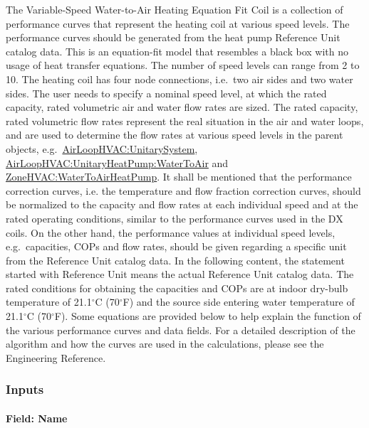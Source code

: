 The Variable-Speed Water-to-Air Heating Equation Fit Coil is a collection of performance curves that represent the heating coil at various speed levels. The performance curves should be generated from the heat pump Reference Unit catalog data. This is an equation-fit model that resembles a black box with no usage of heat transfer equations. The number of speed levels can range from 2 to 10. The heating coil has four node connections, i.e.~two air sides and two water sides. The user needs to specify a nominal speed level, at which the rated capacity, rated volumetric air and water flow rates are sized. The rated capacity, rated volumetric flow rates represent the real situation in the air and water loops, and are used to determine the flow rates at various speed levels in the parent objects, e.g.~\hyperref[airloophvacunitarysystem]{AirLoopHVAC:UnitarySystem}, \hyperref[airloophvacunitaryheatpumpwatertoair]{AirLoopHVAC:UnitaryHeatPump:WaterToAir} and \hyperref[zonehvacwatertoairheatpump]{ZoneHVAC:WaterToAirHeatPump}. It shall be mentioned that the performance correction curves, i.e. the temperature and flow fraction correction curves, should be normalized to the capacity and flow rates at each individual speed and at the rated operating conditions, similar to the performance curves used in the DX coils. On the other hand, the performance values at individual speed levels, e.g.~capacities, COPs and flow rates, should be given regarding a specific unit from the Reference Unit catalog data. In the following content, the statement started with Reference Unit means the actual Reference Unit catalog data. The rated conditions for obtaining the capacities and COPs are at indoor dry-bulb temperature of 21.1$^\circ$C (70$^\circ$F) and the source side entering water temperature of 21.1$^\circ$C (70$^\circ$F). Some equations are provided below to help explain the function of the various performance curves and data fields. For a detailed description of the algorithm and how the curves are used in the calculations, please see the Engineering Reference.

\subsubsection{Inputs}\label{inputs-34}

\paragraph{Field: Name}\label{field-name-33}

